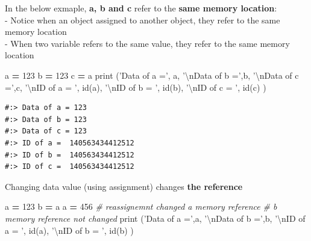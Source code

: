 \documentclass[
]{book}
\newenvironment{Shaded}{\begin{snugshade}}{\end{snugshade}}
\newcommand{\BuiltInTok}[1]{#1}
\newcommand{\CharTok}[1]{\textcolor[rgb]{0.5,0.5,0.5}{#1}}
\newcommand{\CommentTok}[1]{\textcolor[rgb]{0.37,0.37,0.37}{\textit{#1}}}
\newcommand{\DecValTok}[1]{\textcolor[rgb]{0.06,0.06,0.06}{#1}}
\newcommand{\NormalTok}[1]{#1}
\newcommand{\OperatorTok}[1]{\textcolor[rgb]{0.43,0.43,0.43}{\textbf{#1}}}
\newcommand{\StringTok}[1]{\textcolor[rgb]{0.5,0.5,0.5}{#1}}
\begin{document}
In the below exmaple, \textbf{a, b and c } refer to the \textbf{same memory location}:\\
- Notice when an object assigned to another object, they refer to the same memory location\\
- When two variable refers to the same value, they refer to the same memory location

\begin{Shaded}
\begin{Highlighting}[]
\NormalTok{a }\OperatorTok{=} \DecValTok{123}
\NormalTok{b }\OperatorTok{=} \DecValTok{123}  
\NormalTok{c }\OperatorTok{=}\NormalTok{ a}
\BuiltInTok{print}\NormalTok{ (}\StringTok{'Data of a ='}\NormalTok{,  a,}
       \StringTok{'}\CharTok{\textbackslash{}n}\StringTok{Data of b ='}\NormalTok{,b,}
       \StringTok{'}\CharTok{\textbackslash{}n}\StringTok{Data of c ='}\NormalTok{,c,}
       \StringTok{'}\CharTok{\textbackslash{}n}\StringTok{ID of a = '}\NormalTok{, }\BuiltInTok{id}\NormalTok{(a),}
       \StringTok{'}\CharTok{\textbackslash{}n}\StringTok{ID of b = '}\NormalTok{, }\BuiltInTok{id}\NormalTok{(b),}
       \StringTok{'}\CharTok{\textbackslash{}n}\StringTok{ID of c = '}\NormalTok{, }\BuiltInTok{id}\NormalTok{(c)}
\NormalTok{)}
\end{Highlighting}
\end{Shaded}

\begin{verbatim}
#:> Data of a = 123 
#:> Data of b = 123 
#:> Data of c = 123 
#:> ID of a =  140563434412512 
#:> ID of b =  140563434412512 
#:> ID of c =  140563434412512
\end{verbatim}

Changing data value (using assignment) changes \textbf{the reference}

\begin{Shaded}
\begin{Highlighting}[]
\NormalTok{a }\OperatorTok{=} \DecValTok{123}
\NormalTok{b }\OperatorTok{=}\NormalTok{ a}
\NormalTok{a }\OperatorTok{=} \DecValTok{456}  \CommentTok{# reassignemnt changed a memory reference}
         \CommentTok{# b memory reference not changed}
\BuiltInTok{print}\NormalTok{ (}\StringTok{'Data of a ='}\NormalTok{,a,}
     \StringTok{'}\CharTok{\textbackslash{}n}\StringTok{Data of b ='}\NormalTok{,b,}
     \StringTok{'}\CharTok{\textbackslash{}n}\StringTok{ID of a = '}\NormalTok{, }\BuiltInTok{id}\NormalTok{(a),}
     \StringTok{'}\CharTok{\textbackslash{}n}\StringTok{ID of b = '}\NormalTok{, }\BuiltInTok{id}\NormalTok{(b)}
\NormalTok{)}
\end{Highlighting}
\end{Shaded}
\end{document}
